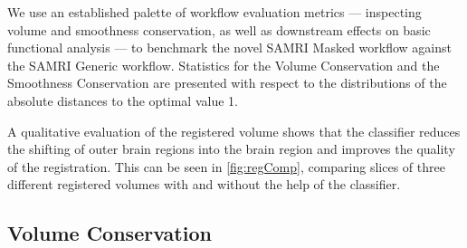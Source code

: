 We use an established palette of workflow evaluation metrics --- inspecting volume and smoothness conservation, as well as downstream effects on basic functional analysis \cite{ioanas_optimized_2019} --- to benchmark the novel SAMRI Masked workflow against the SAMRI Generic workflow.
Statistics for the Volume Conservation and the Smoothness Conservation are presented with respect to the distributions of the absolute distances to the optimal value 1.

A qualitative evaluation of the registered volume shows that the classifier reduces the shifting of outer brain regions into the brain region and improves the quality of the registration.
This can be seen in \cref{fig:regComp}, comparing slices of three different registered volumes with and without the help of the classifier.

\subsection{Volume Conservation}

